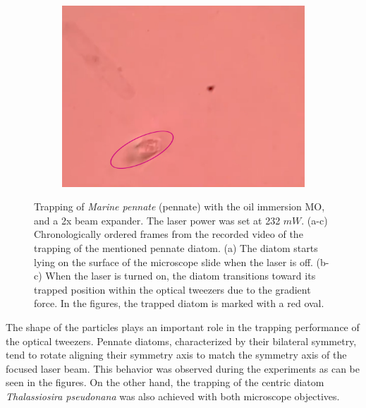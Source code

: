 \documentclass[letterpaper,12pt,oneside]{book}
\begin{document}
\begin{figure}[H]
\begin{subfigure}[b]{0.3\textwidth}
         \caption{}
         \label{fig:three sin x}
     \end{subfigure}
     \hfill
     \begin{subfigure}[b]{0.3\textwidth}
         \centering
         \includegraphics[width=\textwidth]{Results/Fifth/pennate3water.png}
         \caption{}
         \label{fig:five over x}
     \end{subfigure}
       
     \caption{Trapping of \textit{Marine pennate} (pennate) with the oil immersion MO, and a 2x beam expander. The laser power was set at 232 $mW$. (a-c) Chronologically ordered frames from the recorded video of the trapping of the mentioned pennate diatom. (a) The diatom starts lying on the surface of the microscope slide when the laser is off. (b-c) When the laser is turned on, the diatom transitions toward its trapped position within the optical tweezers due to the gradient force. In the figures, the trapped diatom is marked with a red oval.}
\label{WIFORTH1}
     
\end{figure}
\noindent The shape of the particles plays an important role in the trapping performance of the optical tweezers. Pennate diatoms, characterized by their bilateral symmetry, tend to rotate aligning their symmetry axis to match the symmetry axis of the focused laser beam.  This behavior was observed during the experiments as can be seen in the figures. On the other hand, the trapping of the centric diatom \textit{Thalassiosira pseudonana} was also achieved with both microscope objectives.
\end{document}
